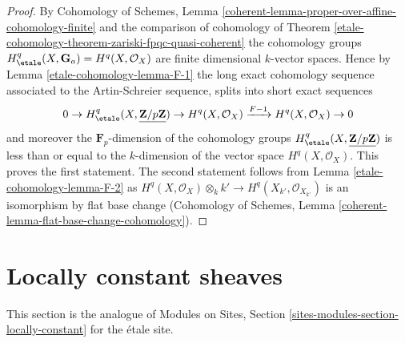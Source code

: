 \begin{proof}
By Cohomology of Schemes, Lemma
\ref{coherent-lemma-proper-over-affine-cohomology-finite}
and the comparison of cohomology of
Theorem \ref{etale-cohomology-theorem-zariski-fpqc-quasi-coherent} the cohomology groups
$H^q_\etale(X, \mathbf{G}_a) = H^q(X, \mathcal{O}_X)$ are
finite dimensional $k$-vector spaces. Hence by
Lemma \ref{etale-cohomology-lemma-F-1} the long exact cohomology sequence
associated to the Artin-Schreier sequence, splits into
short exact sequences
$$
0 \to H_\etale^q(X, \underline{\mathbf{Z}/p\mathbf{Z}}) \to
H^q(X, \mathcal{O}_X) \xrightarrow{F - 1} H^q(X, \mathcal{O}_X) \to 0
$$
and moreover the $\mathbf{F}_p$-dimension of the cohomology groups
$H_\etale^q(X, \underline{\mathbf{Z}/p\mathbf{Z}})$ is less than or equal to the
$k$-dimension of the vector space $H^q(X, \mathcal{O}_X)$.
This proves the first statement. The second statement follows
from Lemma \ref{etale-cohomology-lemma-F-2}
as $H^q(X, \mathcal{O}_X) \otimes_k k' \to H^q(X_{k'}, \mathcal{O}_{X_{k'}})$
is an isomorphism by flat base change
(Cohomology of Schemes,
Lemma \ref{coherent-lemma-flat-base-change-cohomology}).
\end{proof}

\section{Locally constant sheaves}
\label{etale-cohomology-section-locally-constant}
This section is the analogue of
Modules on Sites, Section \ref{sites-modules-section-locally-constant}
for the \'etale site.

